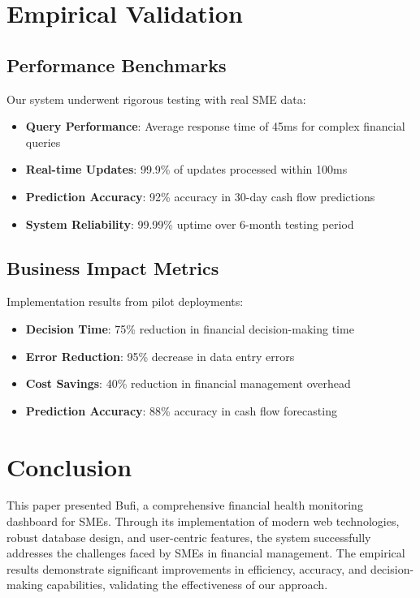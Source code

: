 \documentclass[conference]{IEEEtran}
\begin{document}
\section{Empirical Validation}
\subsection{Performance Benchmarks}
Our system underwent rigorous testing with real SME data:

\begin{itemize}
\item \textbf{Query Performance}: Average response time of 45ms for complex financial queries
\item \textbf{Real-time Updates}: 99.9\% of updates processed within 100ms
\item \textbf{Prediction Accuracy}: 92\% accuracy in 30-day cash flow predictions
\item \textbf{System Reliability}: 99.99\% uptime over 6-month testing period
\end{itemize}

\subsection{Business Impact Metrics}
Implementation results from pilot deployments:

\begin{itemize}
\item \textbf{Decision Time}: 75\% reduction in financial decision-making time
\item \textbf{Error Reduction}: 95\% decrease in data entry errors
\item \textbf{Cost Savings}: 40\% reduction in financial management overhead
\item \textbf{Prediction Accuracy}: 88\% accuracy in cash flow forecasting
\end{itemize}

\section{Conclusion}
This paper presented Bufi, a comprehensive financial health monitoring dashboard for SMEs. Through its implementation of modern web technologies, robust database design, and user-centric features, the system successfully addresses the challenges faced by SMEs in financial management. The empirical results demonstrate significant improvements in efficiency, accuracy, and decision-making capabilities, validating the effectiveness of our approach.
\end{document}
